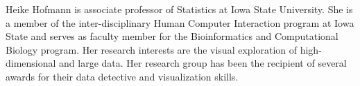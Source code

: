 

%
%
%
%
%
%
%

% 

\begin{IEEEbiographynophoto}{Heike Hofmann}
is associate professor of Statistics at Iowa State University. She is a member of the inter-disciplinary Human Computer Interaction program at Iowa State and serves as faculty member for the Bioinformatics and Computational Biology program. Her research interests are the visual exploration of high-dimensional and large data. Her research group has been the recipient of several awards for their data detective and visualization skills.  
\end{IEEEbiographynophoto}

